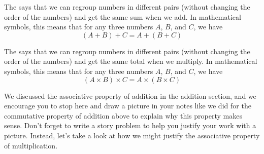 \documentclass{ximera}
\begin{document}
\begin{definition}
The  says that we can regroup numbers in different pairs (without changing the order of the numbers) and get the same sum when we add. In mathematical symbols, this means that for any three numbers $A$, $B$, and $C$, we have
\[
(A + B) + C = A + (B+C)
\]
\end{definition}

\begin{definition}
The  says that we can regroup numbers in different pairs (without changing the order of the numbers) and get the same total when we multiply. In mathematical symbols, this means that for any three numbers $A$, $B$, and $C$, we have
\[
(A \times B) \times C = A \times (B\times C)
\]
\end{definition}

We discussed the associative property of addition in the addition section, and we encourage you to stop here and draw a picture in your notes like we did for the commutative property of addition above to explain why this property makes sense. Don't forget to write a story problem to help you justify your work with a picture. Instead, let's take a look at how we might justify the associative property of multiplication.
\end{document}

